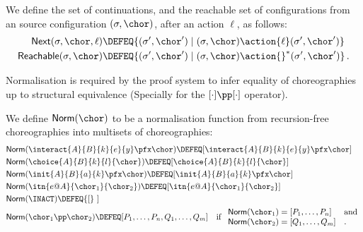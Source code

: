 \begin{notation}
  We define the set of continuations, and the reachable set of
  configurations from an source configuration  $(\sigma, \chor)$, after an action
  $\ell$, as follows:
  \begin{align*}
    \textsf{Next}(\sigma,\chor,\ell) & \DEFEQ
    \{(\sigma',\chor') \mid (\sigma,\chor) \action{\ell} (\sigma',\chor')\}
    \\
    \textsf{Reachable}(\sigma,\chor) & \DEFEQ
    \{(\sigma',\chor') \mid (\sigma,\chor) \action{}^* (\sigma',\chor')\}
    \, .
  \end{align*}

Normalisation is required by the proof system to infer equality of
choreographies up to structural equi\-va\-len\-ce (Specially for the
$[ \cdot ] \pp [ \cdot ]$ operator).

 We define $\textsf{Norm}(\chor)$ to be a normalisation function from
  recursion-free choreographies into multisets of choreographies:
  \begin{align*}    
    &\textsf{Norm}(\interact{A}{B}{k}{e}{y}\pfx \chor) \DEFEQ
    [ \interact{A}{B}{k}{e}{y}\pfx \chor ]
    \\
    &\textsf{Norm}(\choice{A}{B}{k}{l}{\chor}) \DEFEQ
    [ \choice{A}{B}{k}{l}{\chor} ]
    \\
    &\textsf{Norm}(\init{A}{B}{a}{k}\pfx \chor) \DEFEQ
    [\init{A}{B}{a}{k}\pfx \chor]
    \\
    &\textsf{Norm}(\itn{e@A}{\chor_1}{\chor_2}) \DEFEQ
    [\itn{e@A}{\chor_1}{\chor_2}]    
    \\    
    &\textsf{Norm}(\INACT) \DEFEQ {[} \ {]}
    \\
    &\textsf{Norm}(\chor_1 \pp \chor_2) \DEFEQ [
    P_1,\dots,P_n,Q_1,\dots,Q_m ]
    \quad \text{if }
    \begin{array}{ll}
      \textsf{Norm}(\chor_1) = [P_1,\dots,P_n] & \text{and} \\
      \textsf{Norm}(\chor_2) = [Q_1,\dots,Q_m] & .
    \end{array}
  \end{align*}

\end{notation}

